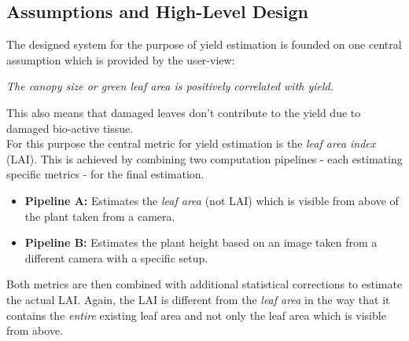 \graphicspath{{members/ssr/figures/}}

\subsection{Assumptions and High-Level Design}


The designed system for the purpose of yield estimation is founded on one central assumption which is provided 
by the user-view:

\begin{center}
    \textit{The canopy size or green leaf area is positively correlated with yield.}    
\end{center}

This also means that damaged leaves don't contribute to the yield due to damaged bio-active tissue.\\

For this purpose the central metric for yield estimation is the \textit{leaf area index} (LAI).
This is achieved by combining two computation pipelines - each estimating specific metrics - for the final estimation.

\begin{itemize}
    \item \textbf{Pipeline A:} Estimates the \textit{leaf area} (not LAI) which is visible from above of the plant
    taken from a camera.
    \item \textbf{Pipeline B:} Estimates the plant height based on an image taken from a different camera
    with a specific setup.
\end{itemize}

Both metrics are then combined with additional statistical corrections to estimate the actual LAI.
Again, the LAI is different from the \textit{leaf area} in the way that it contains
the \textit{entire} existing leaf area and not only the leaf area which is visible from above.
